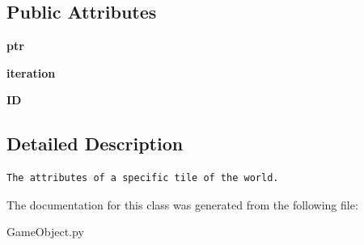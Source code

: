 \subsection*{Public Attributes}
\begin{CompactItemize}
\item 
\hypertarget{classGameObject_1_1Terrain_074268347b24dc6cbbe328c310e7b7a1}{
\textbf{ptr}}
\label{classGameObject_1_1Terrain_074268347b24dc6cbbe328c310e7b7a1}

\item 
\hypertarget{classGameObject_1_1Terrain_204c37c466d3f8036afeb191823dc558}{
\textbf{iteration}}
\label{classGameObject_1_1Terrain_204c37c466d3f8036afeb191823dc558}

\item 
\hypertarget{classGameObject_1_1Terrain_a32339fa2347c1b9ab533d0bd94b3132}{
\textbf{ID}}
\label{classGameObject_1_1Terrain_a32339fa2347c1b9ab533d0bd94b3132}

\end{CompactItemize}


\subsection{Detailed Description}


\footnotesize\begin{verbatim}The attributes of a specific tile of the world.
\end{verbatim}
\normalsize
 

The documentation for this class was generated from the following file:\begin{CompactItemize}
\item 
GameObject.py\end{CompactItemize}
